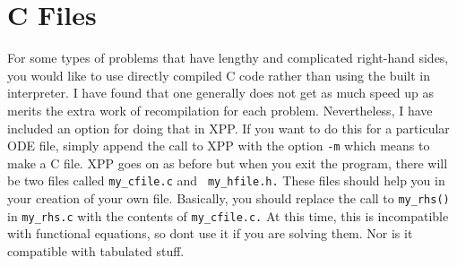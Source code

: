   
\section{C Files} 
For some types of problems that have lengthy and complicated
right-hand sides, you would like to use directly compiled C code
rather than using the built in interpreter.  I have found that one
generally does not get as much speed up as merits the extra work of
recompilation for each problem.  Nevertheless, I have included an
option for doing that in XPP.  If you want to do this for a particular
ODE file, simply append the call to XPP with the option {\tt -m} which
means to make a C file.  XPP goes on as before but when you exit the
program, there will be two files called {\tt my\_cfile.c} and {\tt
my\_hfile.h.}  These files should help you in your creation of your own
file.  Basically, you should replace the call to {\tt my\_rhs()} in
 {\tt my\_rhs.c} with the contents of {\tt my\_cfile.c.} At this time,
this is incompatible with functional equations, so dont use it if you
are solving them. Nor is it compatible with tabulated stuff.


